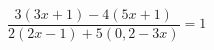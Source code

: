 \begin{ex}[type=equation]
	\begin{condition}
		 $\dfrac{3(3x+1)-4(5x + 1)}{2(2x-1)+5(0,2 - 3x)} = 1$
	\end{condition}
\end{ex}